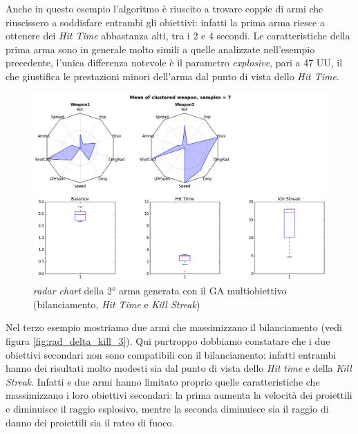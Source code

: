 \documentclass[12pt, italian]{toptesi}
\begin{document}
Anche in questo esempio l'algoritmo è riuscito a trovare coppie di armi che riuscissero a soddisfare entrambi gli obiettivi: infatti la prima arma riesce a ottenere dei \emph{Hit Time} abbastanza alti, tra i 2 e 4 secondi. 
Le caratteristiche della prima arma sono in generale molto simili a quelle analizzate nell'esempio precedente, l'unica differenza notevole è il parametro \emph{explosive}, pari a 47 UU, il che giustifica le prestazioni minori dell'arma dal punto di vista dello \emph{Hit Time}.
\begin{figure}[tp]
\centering
\includegraphics[width=1.0\textwidth]{rad_delta_kill_2}
\caption{\emph{radar chart} della 2° arma generata con il GA multiobiettivo (bilanciamento, \emph{Hit Time} e \emph{Kill Streak})}
\label{fig:rad_delta_kill_2}
\end{figure}
Nel terzo esempio mostriamo due armi che massimizzano il bilanciamento (vedi figura \ref{fig:rad_delta_kill_3}). Qui purtroppo dobbiamo constatare che i due obiettivi secondari non sono compatibili con il bilanciamento: infatti entrambi hanno dei risultati molto modesti sia dal punto di vista dello \emph{Hit time} e della \emph{Kill Streak}. Infatti e due armi hanno limitato proprio quelle caratteristiche che massimizzano i loro obiettivi secondari: la prima aumenta la velocità dei proiettili e diminuisce il raggio esplosivo, mentre la seconda diminuisce sia il raggio di danno dei proiettili sia il rateo di fuoco.
\end{document}
